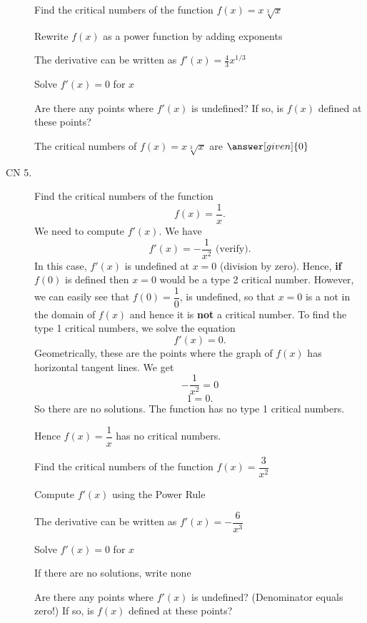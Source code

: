 \documentclass{ximera}
\begin{document}
\begin{description}
\begin{question} %
  Find the critical numbers of the function $f(x) = x\sqrt[3]x$
  
    \begin{hint}
      Rewrite $f(x)$ as a power function by adding exponents
    \end{hint}
    \begin{hint}
      The derivative can be written as $f'(x) = \frac43 x^{1/3}$
    \end{hint}
		\begin{hint}
      Solve $f'(x) = 0$ for $x$
    \end{hint}
    \begin{hint}
      Are there any points where $f'(x)$ is undefined?
      If so, is $f(x)$ defined at these points?  
		\end{hint}
    
    
		The critical numbers of $f(x) = x\sqrt[3]x$ are
		 $\answer[given]{0}$
		
\end{question}



\item[CN 5.] Find the critical numbers of the function 
\[f(x) = \dfrac{1}{x}.\]
We need to compute $f'(x)$.  We have
\[f'(x) = -\frac{1}{ x^2} \mbox{   (verify)}.\]
In this case, $f'(x)$ is undefined at $x = 0$ (division by zero). Hence,  {\bf if}
$f(0)$ is defined then $x=0$ would be a type 2 critical number.  However, we can easily see that $f(0) = \dfrac{1}{0}$, is undefined,  so 
that $x=0$ is a not in the domain of $f(x)$ and hence it is {\bf not} a critical number.
To find the type 1 critical numbers, we solve the equation
\[f'(x) = 0.\]
Geometrically, these are the points where the graph of $f(x)$ has horizontal tangent lines.
We get
\[ -\frac{1}{ x^2}  =0\]
\[ 1 =0.\]
So there are no solutions.  The function has no type 1 critical numbers.


Hence $f(x) = \dfrac{1}{x}$ has no critical numbers. 

\begin{question} %
  Find the critical numbers of the function $f(x) = \dfrac{3}{x^2}$
  
  
    \begin{hint}
      Compute $f'(x)$ using the Power Rule
    \end{hint}
    \begin{hint}
      The derivative can be written as $f'(x) = -\dfrac{6}{x^3}$
    \end{hint}
		\begin{hint}
      Solve $f'(x) = 0$ for $x$
    \end{hint}
		\begin{hint}
      If there are no solutions, write none
    \end{hint}
    \begin{hint}
      Are there any points where $f'(x)$ is undefined? (Denominator equals zero!)
      If so, is $f(x)$ defined at these points?  
		\end{hint}
    

\end{question}
\end{description}
\end{document}
